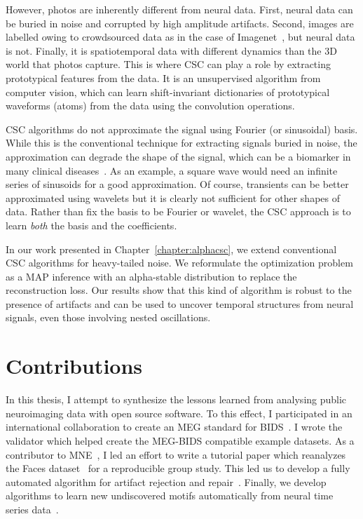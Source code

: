 However, photos are inherently different from neural data. First, neural data can be buried in noise and corrupted by high amplitude artifacts. Second, images are labelled owing to crowdsourced data as in the case of  Imagenet~\citep{deng2009imagenet}, but neural data is not. Finally, it is spatiotemporal data with different dynamics than the 3D world that photos capture. This is where \ac{CSC} can play a role by extracting prototypical features from the data. It is an unsupervised algorithm from computer vision, which can learn shift-invariant dictionaries of prototypical waveforms (atoms) from the data using the convolution operations.

\ac{CSC} algorithms do not approximate the signal using Fourier (or sinusoidal) basis. While this is the conventional technique for extracting signals buried in noise, the approximation can degrade the shape of the signal, which can be a biomarker in many clinical diseases~\citep{cole2017brain}. As an example, a square wave would need an infinite series of sinusoids for a good approximation. Of course, transients can be better approximated using wavelets but it is clearly not sufficient for other shapes of data. Rather than fix the basis to be Fourier or wavelet, the \ac{CSC} approach is to learn \emph{both} the basis and the coefficients.

In our work presented in Chapter~\ref{chapter:alphacsc}, we extend conventional \ac{CSC} algorithms for heavy-tailed noise. We reformulate the optimization problem as a \ac{MAP} inference with an alpha-stable distribution to replace the reconstruction loss. Our results show that this kind of algorithm is robust to the presence of artifacts and can be used to uncover temporal structures from neural signals, even those involving nested oscillations.

\section{Contributions}
In this thesis, I attempt to synthesize the lessons learned from analysing public neuroimaging data with open source software. To this effect, I participated in an international collaboration to create an \ac{MEG} standard for  \ac{BIDS}~\citep{galan2017meg}. I wrote the validator which helped create the MEG-BIDS compatible example datasets. As a contributor to MNE~\citep{gramfort2013meg}, I led an effort to write a tutorial paper which reanalyzes the Faces dataset~\citep{wakeman2015multi} for a reproducible group study. This led us to develop a fully automated algorithm for artifact rejection and repair~\citep{jas2016automated, jas2017autoreject}. Finally, we develop algorithms to learn new undiscovered motifs automatically from neural time series data~\citep{jas2017learning}. 

